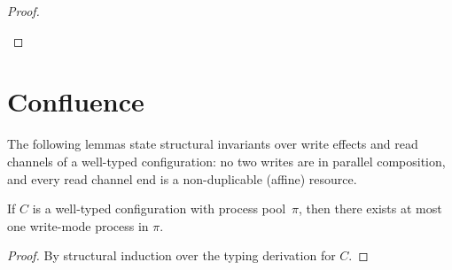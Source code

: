 \begin{theorem}[Preservation]
\begin{proof}
\begin{itemize}[leftmargin=*]
\begin{llproof}
    \end{llproof}
  \end{itemize}

\end{proof}
\end{theorem}


\section{Confluence}

The following lemmas state structural
invariants over write effects and read channels of a well-typed
configuration: no two writes are in parallel composition, and every read channel end is a non-duplicable (affine) resource.

\begin{lemma}
\label{lem:UniqueWriter}
If $C$ is a well-typed configuration with process pool~$\pi$, 
then there exists at most one write-mode process in $\pi$.
\begin{proof}
By structural induction over the typing derivation for $C$.
\end{proof}
\end{lemma}

